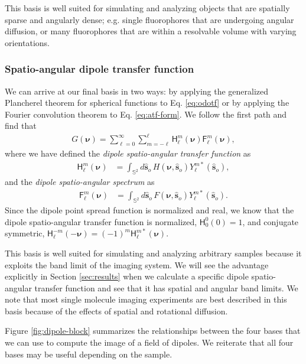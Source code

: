 \documentclass[]{osa-article}
\providecommand{\msf}[1]{\mathsf{#1}}
\providecommand{\so}{\mathbf{\hat{s}}_o}
\providecommand{\mbb}[1]{\mathbb{#1}}
\providecommand{\bs}[1]{\boldsymbol{#1}}
\providecommand{\bv}{\bs{\nu}}
\providecommand{\lmsum}{\sum_{\ell=0}^\infty\sum_{m=-\ell}^{\ell}}
\begin{document}
This basis is well suited for simulating and analyzing objects that are
spatially sparse and angularly dense; e.g. single fluorophores that are
undergoing angular diffusion, or many fluorophores that are within a resolvable
volume with varying orientations.

\subsubsection{Spatio-angular dipole transfer function}
We can arrive at our final basis in two ways: by applying the generalized
Plancherel theorem for spherical functions to Eq. \eqref{eq:odotf} or by applying
the Fourier convolution theorem to Eq. \eqref{eq:atf-form}. We follow the
first path and find that
\begin{align}
G(\bv) = \lmsum \msf{H}_\ell^m(\bv)\msf{F}_\ell^m(\bv) \label{eq:saft},
\end{align}
where we have defined the \textit{dipole spatio-angular transfer function} as
  \begin{align}
  \msf{H}_\ell^m(\bv) &= \int_{\mbb{S}^2}d\so\, H(\bv, \so)Y_\ell^{m*}(\so),
  \end{align}
  and the \textit{dipole spatio-angular spectrum} as
  \begin{align}
  \msf{F}_\ell^m(\bv) &= \int_{\mbb{S}^2}d\so\, F(\bv, \so)Y_\ell^{m*}(\so).
  \end{align}
  Since the dipole point spread function is normalized and real, we know
  that the dipole spatio-angular transfer function is normalized,
  $\msf{H}_0^0(0) = 1$, and conjugate symmetric,
  $\msf{H}_\ell^{-m}(-\bv) = (-1)^m\msf{H}_\ell^{m*}(\bv)$.
  
  This basis is well suited for simulating and analyzing arbitrary samples
  because it exploits the band limit of the imaging system. We will see the
  advantage explicitly in Section \ref{sec:results} when we calculate a specific
  dipole spatio-angular transfer function and see that it has spatial and
  angular band limits. We note that most single molecule imaging experiments
  are best described in this basis because of the effects of spatial and
  rotational diffusion.

  Figure \ref{fig:dipole-block} summarizes the relationships between the four
  bases that we can use to compute the image of a field of dipoles. We reiterate
  that all four bases may be useful depending on the sample.
    
\end{document}
